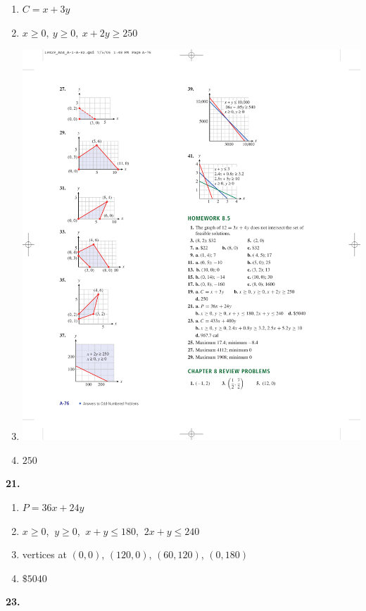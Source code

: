 \documentclass[10pt,]{book}
\theoremstyle{plain}
\theoremstyle{definition}
\theoremstyle{definition}
\theoremstyle{definition}
\numberwithin{equation}{part}
\begin{document}
\begin{multicols}{2}
\begin{enumerate}[label=(\alph*)]
\item\hypertarget{li-73}{}\(C = x + 3y\)%
\item\hypertarget{li-74}{}\(x \ge 0, ~y \ge 0, ~x + 2y \ge 250\)%
\item\hypertarget{li-75}{}\includegraphics[width=0.8\linewidth]{images/fig-ans-8-4-37}
%
\item\hypertarget{li-76}{}\(250\)%
\end{enumerate}
\end{multicols}
%
\par\smallskip
\noindent\textbf{21.}\quad{}\leavevmode%
\begin{multicols}{2}
\begin{enumerate}[label=(\alph*)]
\item\hypertarget{li-77}{}\(P = 36x + 24y\)%
\item\hypertarget{li-78}{}\(x \ge 0\), \(~y \ge 0\), \(~x + y \le 180\), \(~2x+y\le 240\)%
\item\hypertarget{li-79}{}vertices at \((0,0)\), \((120,0)\), \((60,120)\), \((0,180) \)%
\item\hypertarget{li-80}{}\(\$5040\)%
\end{enumerate}
\end{multicols}
%
\par\smallskip
\noindent\textbf{23.}\quad{}\leavevmode%
\end{document}
